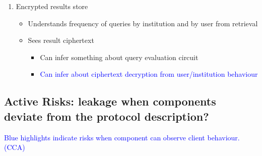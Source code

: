 \begin{enumerate}
\begin{itemize}
\begin{itemize}
                    \end{itemize}
          \end{itemize}
    \item Encrypted results store
          \begin{itemize}
              \item Understands frequency of queries by institution and by user from retrieval
              \item Sees result ciphertext
                    \begin{itemize}
                        \item Can infer something about query evaluation circuit
                        \item \textcolor{blue}{Can infer about ciphertext decryption from user/institution behaviour}
                    \end{itemize}
          \end{itemize}
\end{enumerate}


\subsection{Active Risks: leakage when components deviate from the protocol description?}
\textcolor{blue}{Blue highlights indicate risks when component can observe client behaviour. (CCA)}

